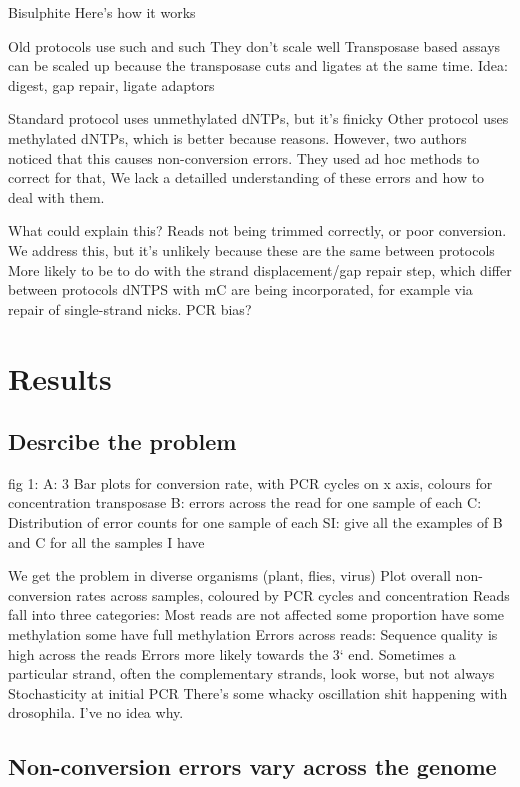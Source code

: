 \documentclass[12pt,longbibliography]{article}
\begin{document}
Bisulphite 
Here's how it works

Old protocols use such and such
They don't scale well
Transposase based assays can be scaled up because the transposase cuts and ligates at the same time.
Idea: digest, gap repair, ligate adaptors

Standard protocol uses unmethylated dNTPs, but it's finicky
Other protocol uses methylated dNTPs, which is better because reasons.
However, two authors noticed that this causes non-conversion errors.
They used ad hoc methods to correct for that,
We lack a detailled understanding of these errors and how to deal with them.

What could explain this?
Reads not being trimmed correctly, or poor conversion.
We address this, but it's unlikely because these are the same between protocols
More likely to be to do with the strand displacement/gap repair step, which differ between protocols
dNTPS with mC are being incorporated, for example via repair of single-strand nicks.
PCR bias?

\section{Results}

\subsection{Desrcibe the problem}

fig 1:
    A: 3 Bar plots for conversion rate, with PCR cycles on x axis, colours for concentration transposase
    B: errors across the read for one sample of each
    C: Distribution of error counts for one sample of each
    SI: give all the examples of B and C for all the samples I have

We get the problem in diverse organisms (plant, flies, virus)
    Plot overall non-conversion rates across samples, coloured by PCR cycles and concentration
Reads fall into three categories:
    Most reads are not affected
    some proportion have some methylation
    some have full methylation
Errors across reads:
    Sequence quality is high across the reads
    Errors more likely towards the 3` end.
    Sometimes a particular strand, often the complementary strands, look worse, but not always
        Stochasticity at initial PCR
    There's some whacky oscillation shit happening with drosophila. I've no idea why.

\subsection{Non-conversion errors vary across the genome}
\end{document}
